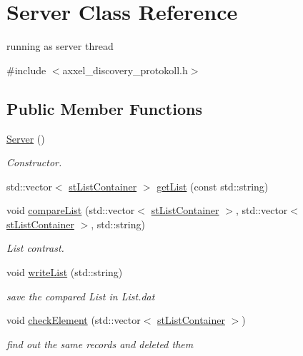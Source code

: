 \hypertarget{classServer}{\section{Server Class Reference}
\label{classServer}
}


running as server thread  




{\ttfamily \#include $<$axxel\-\_\-discovery\-\_\-protokoll.\-h$>$}

\subsection*{Public Member Functions}
\begin{DoxyCompactItemize}
\item 
\hyperlink{classServer_ad5ec9462b520e59f7ea831e157ee5e59}{Server} ()
\begin{DoxyCompactList}\small\item\em Constructor. \end{DoxyCompactList}\item 
std\-::vector$<$ \hyperlink{structstListContainer}{st\-List\-Container} $>$ \hyperlink{classServer_a36e2161377e0960cbafa5bef009c57de}{get\-List} (const std\-::string)
\item 
void \hyperlink{classServer_a10cfd4823ae5286931cbaaf487bd5739}{compare\-List} (std\-::vector$<$ \hyperlink{structstListContainer}{st\-List\-Container} $>$, std\-::vector$<$ \hyperlink{structstListContainer}{st\-List\-Container} $>$, std\-::string)
\begin{DoxyCompactList}\small\item\em List contrast. \end{DoxyCompactList}\item 
void \hyperlink{classServer_a11f06bf832df7df4c73e4c8d8088bc40}{write\-List} (std\-::string)
\begin{DoxyCompactList}\small\item\em save the compared List in List.\-dat \end{DoxyCompactList}\item 
void \hyperlink{classServer_a62a882e58b732a5968d3f70f85786898}{check\-Element} (std\-::vector$<$ \hyperlink{structstListContainer}{st\-List\-Container} $>$)
\begin{DoxyCompactList}\small\item\em find out the same records and deleted them \end{DoxyCompactList}\item 

\end{DoxyCompactItemize}
